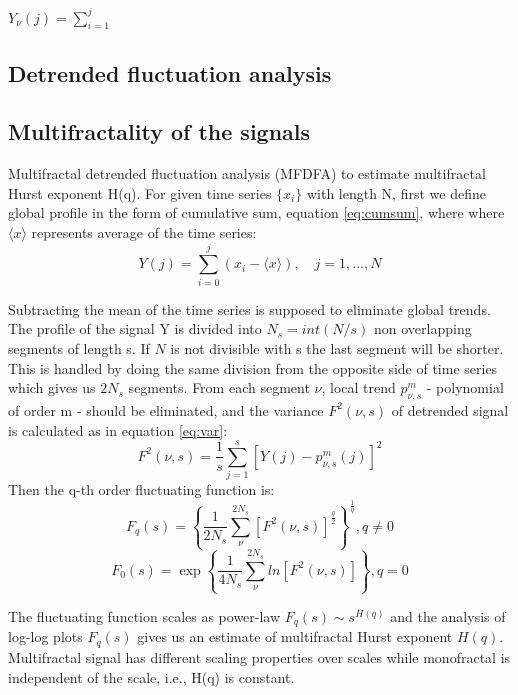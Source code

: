 $Y_\nu(j) = \sum_{i=1}^{j}$




\subsection{Detrended fluctuation analysis}

\subsection{Multifractality of the signals}

Multifractal detrended fluctuation analysis (MFDFA) \cite{kantelhardt2002, ihlen2012} to estimate multifractal Hurst exponent H(q). For given time series $\{x_i\}$ with length N, first we define global profile in the form of cumulative sum, equation \ref{eq:cumsum}, where where $\langle x\rangle $ represents average of the time series:
\begin{equation}
Y(j) = \sum_{i=0} ^j (x_i - \langle x\rangle), \quad j=1, ..., N
\label{eq:cumsum}
\end{equation}

Subtracting the mean of the time series is supposed to eliminate global trends. The profile of the signal Y is divided into $N_s = int (N/s)$ non overlapping segments of length s. If $N$ is not divisible with s the last segment will be shorter. This is handled by doing the same division from the opposite side of time series which gives us $2N_s$ segments. From each segment $\nu$, local trend $p^m_{\nu, s}$ - polynomial of order m - should be eliminated, and the variance $F^2(\nu, s)$ of detrended signal is calculated as in equation \ref{eq:var}:
\begin{equation}
F^2(\nu, s) = \frac{1}{s}\sum_{j=1}^s \left[Y(j) - p^m_{\nu, s}(j)\right]^2
\label{eq:var}
\end{equation}
Then the q-th order fluctuating function is: 
\begin{equation}
F_q(s) = \left\{\frac{1}{2N_s}\sum_{\nu}^{2N_s}\left[F^2(\nu, s)\right]^{\frac{q}{2}}\right\}^{\frac{1}{q}},  q \neq 0 \nonumber
\end{equation}
\begin{equation}
F_0(s) = \exp \left\{\frac{1}{4N_s}\sum_{\nu}^{2N_s}ln \left[F^2(\nu, s)\right]\right\}, q=0
\end{equation}

The fluctuating function scales as power-law $F_q(s) \sim s^{H(q)}$ and the analysis of log-log plots $F_q(s)$ gives us an estimate of multifractal Hurst exponent $H(q)$. Multifractal signal has different scaling properties over scales while monofractal is independent of the scale, i.e., H(q) is constant. 

